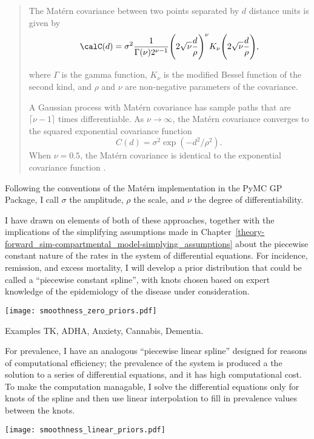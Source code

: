\begin{quote}
The Mat\'{e}rn covariance between two points separated by $d$ distance
units is given by
\[
\calC(d) =
\sigma^2\frac{1}{\Gamma(\nu)2^{\nu-1}}\Bigg(2\sqrt{\nu}\frac{d}{\rho}\Bigg)^\nu
K_\nu\Bigg(2\sqrt{\nu}\frac{d}{\rho}\Bigg),
\]

where $\Gamma$ is the gamma function, $K_\nu$ is the modified Bessel
function of the second kind, and $\rho$ and $\nu$ are non-negative
parameters of the covariance.

A Gaussian process with Mat\'{e}rn covariance has sample paths that are
$\lceil \nu-1 \rceil$ times differentiable. As $\nu\rightarrow\infty$,
the Mat\'{e}rn covariance converges to the squared exponential covariance
function
\[
C(d) = \sigma^2\exp(-d^2/\rho^2). \,
\]
When $\nu = 0.5$, the Mat\'{e}rn covariance is identical to the
exponential covariance function \cite{WP:Matern}.
\end{quote}

Following the conventions of the Mat\'{e}rn implementation in the PyMC GP
Package, I call $\sigma$ the amplitude, $\rho$ the scale, and $\nu$
the degree of differentiability.

I have drawn on elements of both of these approaches, together with
the implications of the simplifying assumptions made in
Chapter~\ref{theory-forward_sim-compartmental_model-simplying_assumptions}
about the piecewise constant nature of the rates in the system of
differential equations.  For incidence, remission, and excess
mortality, I will develop a prior distribution that could be called a
``piecewise constant spline'', with knots chosen based on expert
knowledge of the epidemiology of the disease under consideration.

\begin{center}
\texttt{[image: smoothness\_zero\_priors.pdf]}
\end{center}

Examples TK, ADHA, Anxiety, Cannabis, Dementia.

For prevalence, I have an analogous ``piecewise linear spline''
designed for reasons of computational efficiency; the prevalence of
the system is produced a the solution to a series of differential
equations, and it has high computational cost.  To make the
computation managable, I solve the differential equations only for
knots of the spline and then use linear interpolation to fill in
prevalence values between the knots.
\begin{center}
\texttt{[image: smoothness\_linear\_priors.pdf]}
\end{center}

